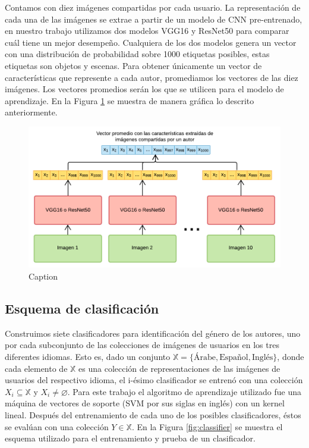 \documentclass[runningheads]{llncs}
\begin{document}
Contamos con diez imágenes compartidas por cada usuario. La representación
de cada una de las imágenes se extrae a partir de un modelo de CNN
pre-entrenado, en nuestro trabajo utilizamos dos modelos VGG16 y ResNet50 para
comparar cuál tiene un mejor desempeño.
Cualquiera de los dos modelos genera un vector con una distribución 
de probabilidad sobre 1000 etiquetas posibles, estas etiquetas son objetos 
y escenas. Para obtener únicamente un vector de características que represente
a cada autor, promediamos los vectores de las diez imágenes. Los vectores
promedios serán los que se utilicen para el modelo de aprendizaje. En la Figura 
\ref{fig:img_representation} se muestra de manera gráfica lo descrito anteriormente.


\begin{figure}
    \centering
    \includegraphics[scale=0.3]{img/features_extraction.png}
    \caption{Caption}
    \label{fig:img_representation}
\end{figure}


\subsection{Esquema de clasificación}

Construimos siete clasificadores para identificación del género de los autores, uno por 
cada subconjunto de las colecciones de imágenes de usuarios en los tres diferentes 
idiomas. Esto es, dado un conjunto $\mathbb{X} = \{\text{Árabe}, \text{Español}, \text{Inglés}\}$, donde cada elemento de $\mathbb{X}$ es una colección de 
representaciones de las imágenes de 
usuarios del respectivo idioma, el i-ésimo clasificador se entrenó con una colección 
$X_i \subseteq \mathbb{X}$ y $X_i \neq \varnothing$. Para este trabajo
el algoritmo de aprendizaje utilizado fue una máquina de vectores de soporte (SVM por 
sus siglas en inglés) con un kernel lineal. Después del entrenamiento 
de cada uno de los posibles clasificadores, éstos se evalúan con una colección $Y \in \mathbb{X}$. En la Figura \ref{fig:classifier} se muestra el esquema utilizado
para el entrenamiento y prueba de un clasificador.
\end{document}
